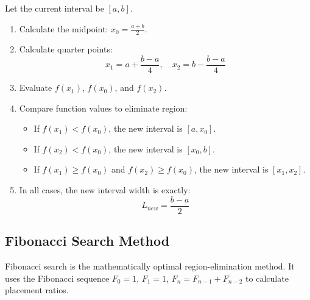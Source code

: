 \documentclass[12pt,a4paper]{article}
\begin{document}
\begin{tcolorbox}[formulabox, title={Interval Halving Algorithm}]
Let the current interval be $[a, b]$.
\begin{enumerate}[label=\textbf{\arabic*.}, leftmargin=*, itemsep=2pt, topsep=0pt]
  \item Calculate the midpoint: $x_0 = \frac{a+b}{2}$.
  \item Calculate quarter points:
    \begin{equation}
      x_1 = a + \frac{b-a}{4}, \quad x_2 = b - \frac{b-a}{4}
    \end{equation}
  \item Evaluate $f(x_1)$, $f(x_0)$, and $f(x_2)$.
  \item Compare function values to eliminate region:
    \begin{itemize}[label=\tiny$\bullet$, leftmargin=1.5em, itemsep=1.5pt]
      \item If $f(x_1) < f(x_0)$, the new interval is $[a, x_0]$.
      \item If $f(x_2) < f(x_0)$, the new interval is $[x_0, b]$.
      \item If $f(x_1) \ge f(x_0)$ and $f(x_2) \ge f(x_0)$, the new interval is $[x_1, x_2]$.
    \end{itemize}
  \item In all cases, the new interval width is exactly:
    \begin{equation}
      L_{new} = \frac{b-a}{2}
    \end{equation}
\end{enumerate}
\end{tcolorbox}

\subsection{Fibonacci Search Method}
Fibonacci search is the mathematically optimal region-elimination method. It uses the Fibonacci sequence $F_0 = 1$, $F_1 = 1$, $F_n = F_{n-1} + F_{n-2}$ to calculate placement ratios.
\end{document}
